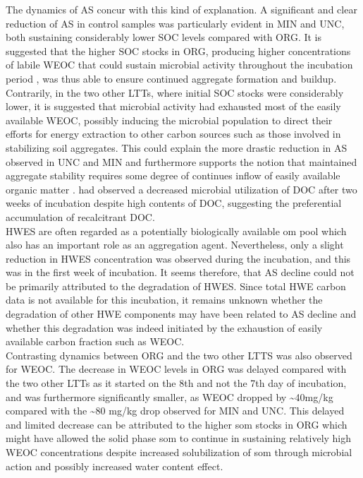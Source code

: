 \documentclass[12pt]{report}
\begin{document}
		The dynamics of AS concur with this kind of explanation. A significant and clear reduction of AS in control samples was particularly evident in MIN and UNC, both sustaining considerably lower SOC levels compared with ORG. It is suggested that the higher SOC stocks in ORG, producing higher concentrations of labile WEOC that could sustain microbial activity throughout the incubation period , was thus able to ensure continued aggregate formation and buildup. Contrarily, in the two other LTTs, where initial SOC stocks were considerably lower, it is suggested that microbial activity had exhausted most of the easily available WEOC, possibly inducing the microbial population to direct their efforts for energy extraction to other carbon sources such as those involved in stabilizing soil aggregates. This could explain the more drastic reduction in AS observed in UNC and MIN and furthermore supports the notion that maintained aggregate stability requires some degree of continues inflow of easily available organic matter \citep{golchin1994}. \citet{cook1992} had observed a decreased microbial utilization of DOC after two weeks of incubation despite high contents of DOC, suggesting the preferential accumulation of recalcitrant DOC.\\
		HWES are often regarded as a potentially biologically available \gls{om} pool which also has an important role as an aggregation agent. Nevertheless, only a slight reduction in HWES concentration was observed during the incubation, and this was in the first week of incubation. It seems therefore, that AS decline could not be primarily attributed to the degradation of HWES. Since total HWE carbon data is not available for this incubation, it remains unknown whether the degradation of other HWE components may have been related to AS decline and whether this degradation was indeed initiated by  the exhaustion of easily available carbon fraction such as WEOC.\\
		\hypertarget{weoc_decrease}{}
		Contrasting dynamics between ORG and the two other LTTS was also observed for WEOC. The decrease in WEOC levels in ORG was delayed compared with the two other LTTs as it started on the 8th and not the 7th day of incubation, and was furthermore significantly smaller, as WEOC dropped by \~{}40mg/kg compared with the \~{}80 mg/kg drop observed for MIN and UNC. This delayed and limited decrease can be attributed to the higher \gls{som} stocks in ORG which might have allowed the solid phase \gls{som} to continue in sustaining relatively high WEOC concentrations despite increased solubilization of \gls{som} through microbial action and possibly increased water content effect.\\
\end{document}
